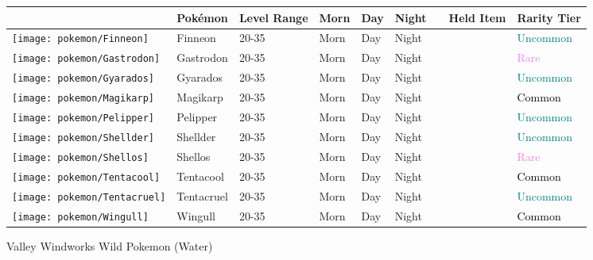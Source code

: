 \begin{longtable}{||l l l l l l l l l||}%
\hline%
&Pokémon&Level Range&Morn&Day&Night&&Held Item&Rarity Tier\\%
\hline%
\endhead%
\hline%
\texttt{[image: pokemon/Finneon]}&Finneon&20{-}35&Morn&Day&Night&&&\textcolor{teal}{%
Uncommon%
}\\%
\hline%
\texttt{[image: pokemon/Gastrodon]}&Gastrodon&20{-}35&Morn&Day&Night&&&\textcolor{violet}{%
Rare%
}\\%
\hline%
\texttt{[image: pokemon/Gyarados]}&Gyarados&20{-}35&Morn&Day&Night&&&\textcolor{teal}{%
Uncommon%
}\\%
\hline%
\texttt{[image: pokemon/Magikarp]}&Magikarp&20{-}35&Morn&Day&Night&&&\textcolor{black}{%
Common%
}\\%
\hline%
\texttt{[image: pokemon/Pelipper]}&Pelipper&20{-}35&Morn&Day&Night&&&\textcolor{teal}{%
Uncommon%
}\\%
\hline%
\texttt{[image: pokemon/Shellder]}&Shellder&20{-}35&Morn&Day&Night&&&\textcolor{teal}{%
Uncommon%
}\\%
\hline%
\texttt{[image: pokemon/Shellos]}&Shellos&20{-}35&Morn&Day&Night&&&\textcolor{violet}{%
Rare%
}\\%
\hline%
\texttt{[image: pokemon/Tentacool]}&Tentacool&20{-}35&Morn&Day&Night&&&\textcolor{black}{%
Common%
}\\%
\hline%
\texttt{[image: pokemon/Tentacruel]}&Tentacruel&20{-}35&Morn&Day&Night&&&\textcolor{teal}{%
Uncommon%
}\\%
\hline%
\texttt{[image: pokemon/Wingull]}&Wingull&20{-}35&Morn&Day&Night&&&\textcolor{black}{%
Common%
}\\%
\hline%
\end{longtable}%
\caption{Valley Windworks Wild Pokemon (Water)}